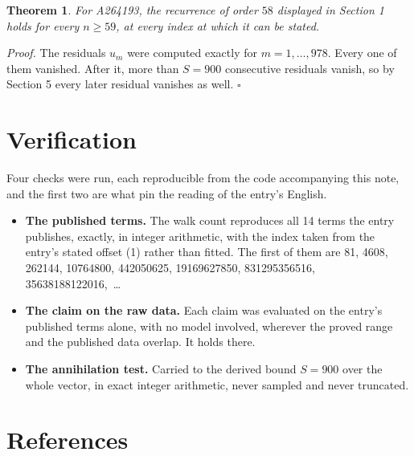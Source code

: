 \documentclass[11pt]{article}
\newtheorem{theorem}{Theorem}
\theoremstyle{definition}
\begin{document}
\begin{theorem} For A264193, the recurrence of order $58$ displayed in Section 1 holds for every $n \ge 59$, at every index at which it can be stated.\end{theorem}

{\itshape Proof.} The residuals $u_m$ were computed exactly for $m = 1,\dots,978$. Every one of them vanished. After it, more than $S = 900$ consecutive residuals vanish, so by Section 5 every later residual vanishes as well. $\square$

\section{Verification}

Four checks were run, each reproducible from the code accompanying this note, and the first two are what pin the reading of the entry's English.

\begin{itemize}

\item {\bfseries The published terms.} The walk count reproduces all 14 terms the entry publishes, exactly, in integer arithmetic, with the index taken from the entry's stated offset (1) rather than fitted. The first of them are 81, 4608, 262144, 10764800, 442050625, 19169627850, 831295356516, 35638188122016,~\dots

\item {\bfseries The claim on the raw data.} Each claim was evaluated on the entry's published terms alone, with no model involved, wherever the proved range and the published data overlap. It holds there.

\item {\bfseries The annihilation test.} Carried to the derived bound $S = 900$ over the whole vector, in exact integer arithmetic, never sampled and never truncated.

\end{itemize}

\section{References}
\end{document}
